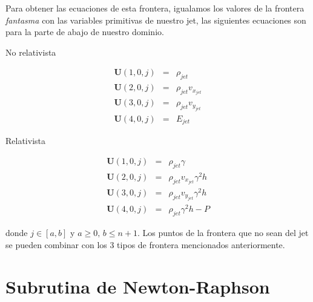 \documentclass[12pt,a4paper]{book}
\begin{document}
Para obtener las ecuaciones de esta frontera, igualamos los valores de la frontera \emph{fantasma} con las variables primitivas de nuestro jet, las siguientes ecuaciones son para la parte de abajo de nuestro dominio.

No relativista

\begin{eqnarray}
\textbf{U}(1,0,j)&=&\rho_{jet} \\
\textbf{U}(2,0,j)&=& \rho_{jet} v_{x_{jet}}\\
\textbf{U}(3,0,j)&=& \rho_{jet} v_{y_{jet}}\\
\textbf{U}(4,0,j)&=& E_{jet}
\end{eqnarray}

Relativista

\begin{eqnarray}
\textbf{U}(1,0,j)&=&\rho_{jet} \gamma \\
\textbf{U}(2,0,j)&=& \rho_{jet} v_{x_{jet}} \gamma^2 h \\
\textbf{U}(3,0,j)&=& \rho_{jet} v_{y_{jet}} \gamma^2 h \\
\textbf{U}(4,0,j)&=& \rho_{jet} \gamma^2 h-P
\end{eqnarray}

donde $j\in \left[ a,b \right]$ y $a\geq 0, \, b\leq n+1$. Los puntos de la frontera que no sean del jet se pueden combinar con los 3 tipos de frontera mencionados anteriormente.


\chapter{Subrutina de Newton-Raphson}\label{ap_newrap}
\end{document}
